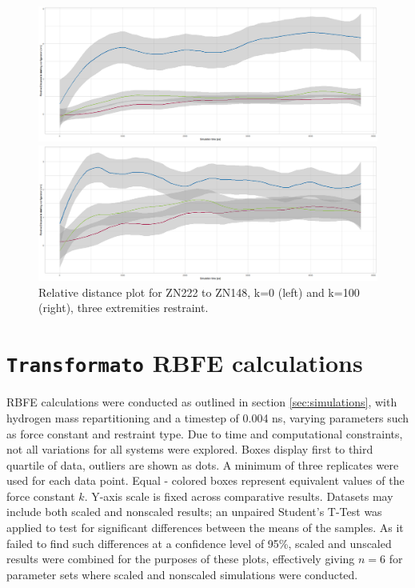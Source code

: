 \documentclass[oneside]{scrreprt}
\begin{document}
\begin{figure}[h]
    
    

\begin{minipage}{0.5\textwidth}
\includegraphics[width=1\textwidth]{plots/reldistplot_zn222_k0ex3.png}
\end{minipage}
\begin{minipage}{0.5\textwidth}
\includegraphics[width=1\textwidth]{plots/reldistplot_zn222_k100ex3.png}
\end{minipage}


\caption[Relative distance plot: ZN222 to ZN148, k=3 and k=100 (ex3)]{Relative distance plot for ZN222 to ZN148, k=0 (left) and k=100 (right), three extremities restraint.}
\label{fig:reldist_zn222ex3ref}
\end{figure}
\section{\texttt{Transformato} RBFE calculations}\label{sec:results_tf_rbfe}
RBFE calculations were conducted as outlined in section \ref{sec:simulations}, with hydrogen mass repartitioning and a timestep of 0.004 ns, varying parameters such as force constant and restraint type. Due to time and computational constraints, not all variations for all systems were explored. Boxes display first to third quartile of data, outliers are shown as dots. A minimum of three replicates were used for each data point. Equal - colored boxes represent equivalent values of the force constant $k$. Y-axis scale is fixed across comparative results. Datasets may include both scaled and nonscaled results; an unpaired Student's T-Test \cite{luroth_vergleichung_1876} was applied to test for significant differences between the means of the samples. As it failed to find such differences at a confidence level of 95\%, scaled and unscaled results were combined for the purposes of these plots, effectively giving $n=6$ for parameter sets where scaled and nonscaled simulations were conducted.
\end{document}
